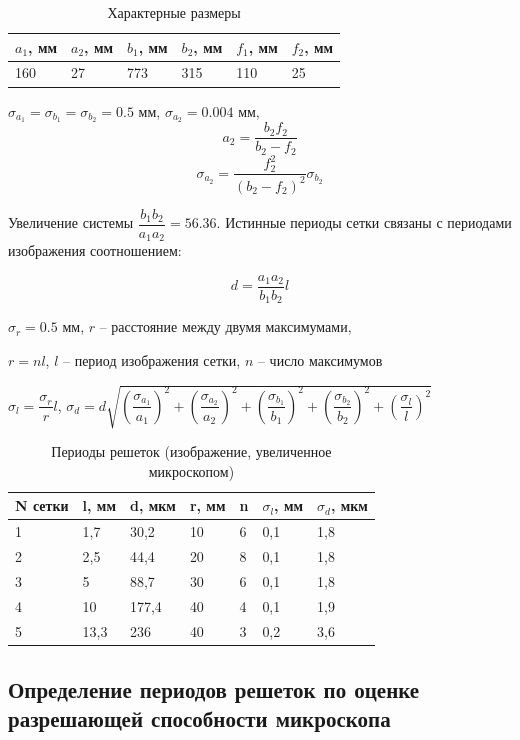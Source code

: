 \documentclass[a4paper, 12pt]{article}
\begin{document}
\begin{table}[h!] \label{Tab2}
\centering
\begin{tabular}{|l|l|l|l|l|l|}
\hline
$a_1$, мм & $a_2$, мм & $b_1$, мм & $b_2$, мм & $f_1$, мм & $f_2$, мм \\ \hline
160    & 27     & 773    & 315    & 110    & 25     \\ \hline
\end{tabular}
\caption{Характерные размеры}
\end{table}

$\sigma_{a_1} = \sigma_{b_1} = \sigma_{b_2} =0.5$ мм, $\sigma_{a_2} = 0.004$ мм,
\[a_2 = \dfrac{b_2 f_2}{b_2 - f_2}\]
\[\sigma_{a_2} = \dfrac{f_{2}^2}{(b_2 - f_2)^2} \sigma_{b_2}\]

Увеличение системы $\dfrac{b_1b_2}{a_1a_2} = 56.36$. Истинные периоды сетки связаны с периодами изображения соотношением:

\[d = \dfrac{a_1a_2}{b_1b_2} l\]

$\sigma_r = 0.5$ мм, $r$ -- расстояние между двумя максимумами,

$r = nl$, $l$ -- период изображения сетки, $n$ -- число максимумов

$\sigma_l = \dfrac{\sigma_r}{r}l$, $\sigma_d = d \sqrt{(\dfrac{\sigma_{a_1}}{a_1})^2+(\dfrac{\sigma_{a_2}}{a_2})^2+(\dfrac{\sigma_{b_1}}{b_1})^2+(\dfrac{\sigma_{b_2}}{b_2})^2+(\dfrac{\sigma_l}{l})^2}$

\begin{table}[h!] \label{Tab3}
\centering
\begin{tabular}{|l|l|l|l|l|l|l|}
\hline
N сетки & l, мм & d, мкм & r, мм & n & $\sigma_l$, мм & $\sigma_d$, мкм \\ \hline
1       & 1,7   & 30,2   & 10    & 6 &            0,1 &      1,8        \\ \hline
2       & 2,5   & 44,4   & 20    & 8 &            0,1 &       1,8       \\ \hline
3       & 5     & 88,7   & 30    & 6 &            0,1 &        1,8      \\ \hline
4       & 10    & 177,4  & 40    & 4 &            0,1 &         1,9     \\ \hline
5       & 13,3  & 236    & 40    & 3 &            0,2 &          3,6    \\ \hline
\end{tabular}
\caption{Периоды решеток (изображение, увеличенное микроскопом)}
\end{table}

\subsection*{Определение периодов решеток по оценке разрешающей способности микроскопа}
\end{document}
